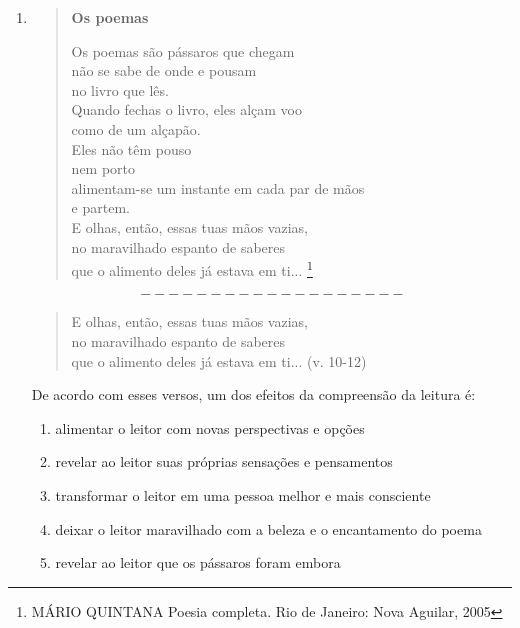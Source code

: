 \documentclass[10pt,a4paper]{article}
\begin{document}
\begin{multicols}{2}
\begin{enumerate}
	\item
	\begin{quote}
	 	\begin{center} \textbf{Os poemas} \end{center}
		Os poemas s\~ao p\'assaros que chegam\\
		n\~ao se sabe de onde e pousam\\
		no livro que l\^es.\\
		Quando fechas o livro, eles al\c{c}am voo\\
		como de um al\c{c}ap\~ao.\\
		Eles n\~ao t\^em pouso\\
		nem porto\\
		alimentam-se um instante em cada par de m\~aos\\
		e partem.\\
		E olhas, ent\~ao, essas tuas m\~aos vazias,\\
		no maravilhado espanto de saberes\\
		que o alimento deles j\'a estava em ti... \footnote{M\'ARIO QUINTANA 
Poesia completa. Rio de Janeiro: Nova Aguilar, 2005}
	\end{quote}
	$$ -------------------  $$
	\begin{quote}
	E olhas, ent\~ao, essas tuas m\~aos vazias, \\
no maravilhado espanto de saberes \\
que o alimento deles j\'a estava em ti... (v. 10-12) \\
	\end{quote}
	De acordo com esses versos, um dos efeitos da compreens\~ao da leitura \'e: 
		\begin{enumerate}
		\item alimentar o leitor com novas perspectivas e op\c{c}\~oes
		\item revelar ao leitor suas pr\'oprias sensa\c{c}\~oes e pensamentos
		\item transformar o leitor em uma pessoa melhor e mais consciente
		\item deixar o leitor maravilhado com a beleza e o encantamento do poema
		\item revelar ao leitor que os p\'assaros foram embora
		\end{enumerate}



\end{enumerate}
\end{multicols}
\end{document}
